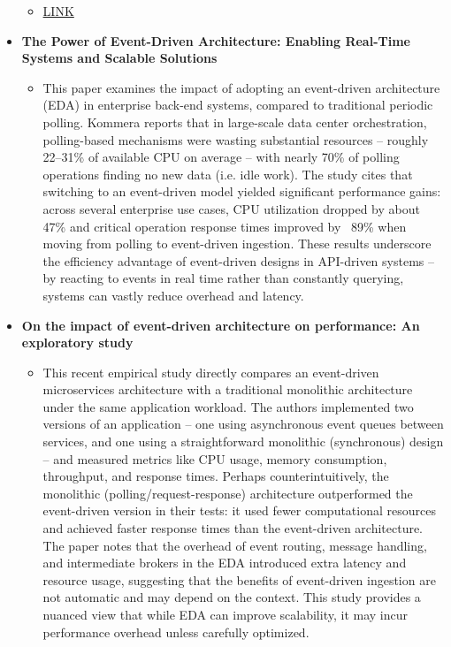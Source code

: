 \documentclass[11pt]{article}
\begin{document}
\begin{itemize}
\begin{itemize}
      \item[] \href{https://www.researchgate.net/publication/335426973\_Energy-Efficient\_Network\_Protocols\_for\_Domestic\_IoT\_Application\_Design}{LINK}
  \end{itemize}
  \newpage
  \item[] \textbf{The Power of Event-Driven Architecture: Enabling Real-Time Systems and Scalable Solutions}
  \begin{itemize}
      \item[] This paper examines the impact of adopting an event-driven architecture (EDA) in enterprise back-end systems, compared to traditional periodic polling. Kommera reports that in large-scale data center orchestration, polling-based mechanisms were wasting substantial resources – roughly 22–31\% of available CPU on average – with nearly 70\% of polling operations finding no new data (i.e. idle work). The study cites that switching to an event-driven model yielded significant performance gains: across several enterprise use cases, CPU utilization dropped by about 47\% and critical operation response times improved by ~89\% when moving from polling to event-driven ingestion. These results underscore the efficiency advantage of event-driven designs in API-driven systems – by reacting to events in real time rather than constantly querying, systems can vastly reduce overhead and latency.
  \end{itemize}
  \item[] \textbf{On the impact of event-driven architecture on performance: An exploratory
study}
  \begin{itemize}
      \item[] This recent empirical study directly compares an event-driven microservices architecture with a traditional monolithic architecture under the same application workload. The authors implemented two versions of an application – one using asynchronous event queues between services, and one using a straightforward monolithic (synchronous) design – and measured metrics like CPU usage, memory consumption, throughput, and response times. Perhaps counterintuitively, the monolithic (polling/request-response) architecture outperformed the event-driven version in their tests: it used fewer computational resources and achieved faster response times than the event-driven architecture. The paper notes that the overhead of event routing, message handling, and intermediate brokers in the EDA introduced extra latency and resource usage, suggesting that the benefits of event-driven ingestion are not automatic and may depend on the context. This study provides a nuanced view that while EDA can improve scalability, it may incur performance overhead unless carefully optimized.

\end{itemize}
\end{itemize}
\end{document}
